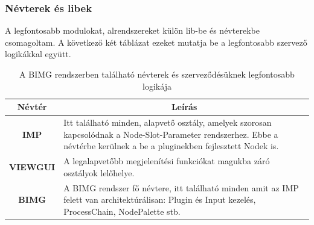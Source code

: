 \documentclass[a4paper,12pt,oneside]{report}
\begin{document}
\subsubsection{Névterek és libek}
A legfontosabb modulokat, alrendszereket külön lib-be és névterekbe csomagoltam. A következő két táblázat ezeket mutatja be a legfontosabb szervező logikákkal együtt.
\begin{table}[h]
\begin{tabular}{p{1cm}|p{12cm}}

\toprule
\multicolumn{1}{c|}{\textbf{Névtér}} & \multicolumn{1}{|c}{\textbf{Leírás}} \\ \midrule
\multicolumn{1}{c|}{\textbf{IMP}}  & Itt található minden, alapvető osztály, amelyek szorosan kapcsolódnak a Node-Slot-Parameter rendszerhez. Ebbe a névtérbe kerülnek a be a pluginekben fejlesztett Nodek is.\\
\hline
\multicolumn{1}{c|}{\textbf{VIEWGUI}}  &  A legalapvetőbb megjelenítési funkciókat magukba záró osztályok lelőhelye.\\
\hline
\multicolumn{1}{c|}{\textbf{BIMG}}  & A BIMG rendszer fő névtere, itt található minden amit az IMP felett van architektúrálisan: Plugin és Input kezelés, ProcessChain, NodePalette stb. \\
\hline

\end{tabular}
\caption{A BIMG rendszerben található névterek és szerveződésüknek legfontosabb logikája }
\label{table:bimg_namespace}
\end{table}
\end{document}
